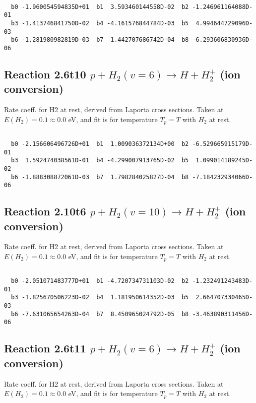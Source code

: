 \begin{small}\begin{verbatim}

  b0 -1.960054594835D+01  b1  3.593460144558D-02  b2 -1.246961164088D-01
  b3 -1.413746841750D-02  b4 -4.161576844784D-03  b5  4.994644729096D-03
  b6 -1.281980982819D-03  b7  1.442707686742D-04  b8 -6.293606830936D-06

\end{verbatim}\end{small}

\newpage
\subsection{
Reaction 2.6t10
$ p + H_2(v=6) \rightarrow H + H_2^+$ (ion conversion)
}
Rate coeff. for H2 at rest, derived from Laporta cross sections.
Taken at $E(H_2) = 0.1 \approx 0.0$ eV,  and fit is for temperature $T_p=T$ with $H_2$ at rest.

\begin{small}\begin{verbatim}

  b0 -2.156606496726D+01  b1  1.009036372134D+00  b2 -6.529665915179D-01
  b3  1.592474038561D-01  b4 -4.299007913765D-02  b5  1.099014189245D-02
  b6 -1.888308872061D-03  b7  1.798284025827D-04  b8 -7.184232934066D-06

\end{verbatim}\end{small}

\newpage
\subsection{
Reaction 2.10t6
$ p + H_2(v=10) \rightarrow H + H_2^+$ (ion conversion)
}
Rate coeff. for H2 at rest, derived from Laporta cross sections.
Taken at $E(H_2) = 0.1 \approx 0.0$ eV,  and fit is for temperature $T_p=T$ with $H_2$ at rest.

\begin{small}\begin{verbatim}

  b0 -2.051071483777D+01  b1 -4.720734731103D-02  b2 -1.232491243483D-01
  b3 -1.825670506223D-02  b4  1.181950614352D-03  b5  2.664707330465D-03
  b6 -7.631065654263D-04  b7  8.450965024792D-05  b8 -3.463890311456D-06

\end{verbatim}\end{small}

\newpage
\subsection{
Reaction 2.6t11
$ p + H_2(v=6) \rightarrow H + H_2^+$ (ion conversion)
}
Rate coeff. for H2 at rest, derived from Laporta cross sections.
Taken at $E(H_2) = 0.1 \approx 0.0$ eV,  and fit is for temperature $T_p=T$ with $H_2$ at rest.

